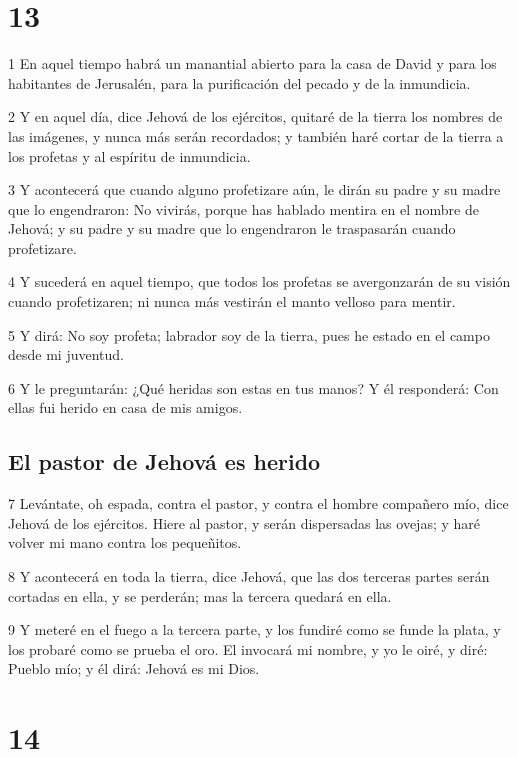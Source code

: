 \chapter{13}

\par 1 En aquel tiempo habrá un manantial abierto para la casa de David y para los habitantes de Jerusalén, para la purificación del pecado y de la inmundicia.
\par 2 Y en aquel día, dice Jehová de los ejércitos, quitaré de la tierra los nombres de las imágenes, y nunca más serán recordados; y también haré cortar de la tierra a los profetas y al espíritu de inmundicia.
\par 3 Y acontecerá que cuando alguno profetizare aún, le dirán su padre y su madre que lo engendraron: No vivirás, porque has hablado mentira en el nombre de Jehová; y su padre y su madre que lo engendraron le traspasarán cuando profetizare.
\par 4 Y sucederá en aquel tiempo, que todos los profetas se avergonzarán de su visión cuando profetizaren; ni nunca más vestirán el manto velloso para mentir.
\par 5 Y dirá: No soy profeta; labrador soy de la tierra, pues he estado en el campo desde mi juventud.
\par 6 Y le preguntarán: ¿Qué heridas son estas en tus manos? Y él responderá: Con ellas fui herido en casa de mis amigos.

\section*{El pastor de Jehová es herido}

\par 7 Levántate, oh espada, contra el pastor, y contra el hombre compañero mío, dice Jehová de los ejércitos. Hiere al pastor, y serán dispersadas las ovejas; y haré volver mi mano contra los pequeñitos.
\par 8 Y acontecerá en toda la tierra, dice Jehová, que las dos terceras partes serán cortadas en ella, y se perderán; mas la tercera quedará en ella.
\par 9 Y meteré en el fuego a la tercera parte, y los fundiré como se funde la plata, y los probaré como se prueba el oro. El invocará mi nombre, y yo le oiré, y diré: Pueblo mío; y él dirá: Jehová es mi Dios.

\chapter{14}

